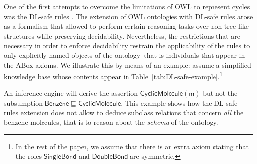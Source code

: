\documentclass[10pt]{bmc_article}
\newenvironment{bmcformat}{\baselineskip20pt\sloppy\setboolean{publ}{false}}{\baselineskip20pt\sloppy}
\begin{document}
\begin{bmcformat}
One of the first attempts to overcome the limitations of OWL to represent cycles was the DL-safe rules \cite{DLSafeBoris}. The extension of OWL ontologies with DL-safe rules arose as a formalism that allowed to perform certain reasoning tasks over non-tree-like structures while preserving decidability. Nevertheless, the restrictions that are necessary in order to enforce decidability restrain the applicability of the rules to only explicitly named objects of the ontology--that is individuals that appear in the ABox axioms. We illustrate this by means of an example: assume a simplified knowledge base whose contents appear in Table~\ref{tab:DL-safe-example}.\footnote{In the rest of the paper, we assume that there is an extra axiom stating that the roles $\mathsf{SingleBond}$ and $\mathsf{DoubleBond}$ are symmetric.} 
\begin{comment}
\begin{table}[t]
\centering
\caption{DL-safe rules example}\label{tab:DL-safe-example}
\rowcolors{1}{tableShade}{white}
\begin{tabular}{|l|l|}
    \hline
    TBox axiom    & $\mathsf{\exists hasAtom.RingAtom \sqsubseteq CyclicMolecule}$ \\
    ABox axioms & $\mathsf{Benzene(m),singleBond(a_1,a_2),doubleBond(a_2,a_3),singleBond(a_3,a_4),doubleBond(a_4,a_5),}$ \\ 
     & $\mathsf{singleBond(a_5,a_6),doubleBond(a_6,a_1),Carbon(a_i),hasAtom(m,a_i)}$  for each $ 1 \leq \mathsf{i} \leq 6$ \\
     DL-safe rule &  $\mathsf{ \bigwedge_{1 \leq i \leq 6}   Carbon(x_i)   \wedge singleBond(x_1,x_2) \wedge doubleBond(x_2,x_3) \wedge singleBond(x_3,x_4)} \wedge{}$ \\
     & $\mathsf{doubleBond(x_4,x_5) \wedge singleBond(x_5,x_6) \wedge doubleBond(x_6,x_1) \rightarrow RingAtom(x_1)}$ \\
      
     \hline 
\end{tabular}
\end{table}
%
\end{comment}
An inference engine will derive the assertion $\mathsf{CyclicMolecule(m)}$ but not the subsumption $\mathsf{Benzene \sqsubseteq CyclicMolecule}$. This example shows how the DL-safe rules extension does not allow to deduce subclass relations that concern \emph{all} the benzene molecules, that is to reason about the \emph{schema} of the ontology. 


\end{bmcformat}
\end{document}
